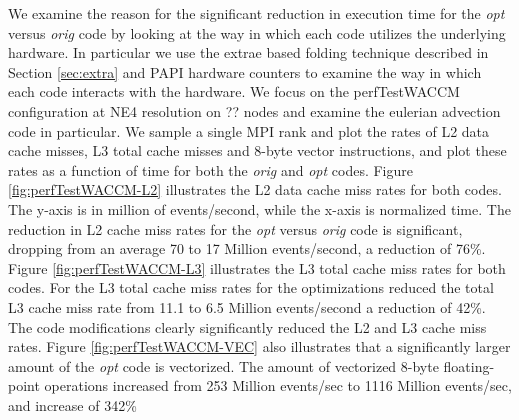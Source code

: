 We examine the reason for the significant reduction in execution time for the {\em opt} versus {\em orig} code by looking at the way in which each code utilizes the underlying hardware.  In particular we use the extrae based folding technique described in Section \ref{sec:extra} and PAPI hardware counters \cite{papi} to examine the way in which each code interacts with the hardware.  We focus on the perfTestWACCM configuration at NE4 resolution on {\color{red} ??} nodes and examine the eulerian advection code in particular.  We sample a single MPI rank and plot the rates of L2 data cache misses, L3 total cache misses and 8-byte vector instructions, and plot these rates as a function of time for both the {\em orig} and {\em opt} codes.  Figure \ref{fig:perfTestWACCM-L2} illustrates the L2 data cache miss rates for both codes. The y-axis is in million of events/second, while the x-axis is normalized time.  The reduction in L2 cache miss rates for the {\em opt} versus {\em orig} code is significant, dropping from an average 70 to 17 Million events/second, a reduction of 76\%.  Figure \ref{fig:perfTestWACCM-L3} illustrates the L3 total cache miss rates for both codes.  For the L3 total cache miss rates for the optimizations reduced the total L3 cache miss rate from 11.1 to 6.5 Million events/second a reduction of 42\%.  The code modifications clearly significantly reduced the L2 and L3 cache miss rates.  Figure \ref{fig:perfTestWACCM-VEC} also illustrates that a significantly larger amount of the {\em opt} code is vectorized.  The amount of vectorized 8-byte floating-point operations increased from 253 Million events/sec to 1116 Million events/sec, and increase of 342\%

